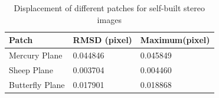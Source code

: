 \begin{table}[htbp]
	\centering
	\scriptsize  
	\begin{tabular}{p{80pt} p{60pt} p{60pt}}
		\toprule
		Patch & {\bfseries RMSD (pixel)} & {\bfseries Maximum(pixel)}\\ \midrule
		Mercury Plane&  0.044846&0.045849 \\
		\addlinespace[3pt]
		Sheep Plane  &  0.003704&0.004460 \\
		\addlinespace[3pt]
		Butterfly Plane & 0.017901&0.018868\\ \bottomrule
	\end{tabular}
	\caption{Displacement of different patches for self-built stereo images}  
	\label{tab:Displacement of different patches for self-built stereo images} 
\end{table}

